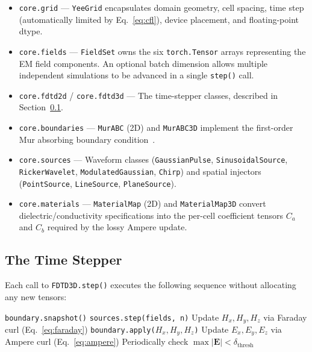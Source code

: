 \documentclass[10pt,twocolumn]{article}
\begin{document}
\begin{itemize}
  \item \texttt{core.grid} — \texttt{YeeGrid} encapsulates domain geometry,
        cell spacing, time step (automatically limited by Eq.~\ref{eq:cfl}),
        device placement, and floating-point dtype.
  \item \texttt{core.fields} — \texttt{FieldSet} owns the six
        \texttt{torch.Tensor} arrays representing the EM field components.
        An optional batch dimension allows multiple independent simulations
        to be advanced in a single \texttt{step()} call.
  \item \texttt{core.fdtd2d} / \texttt{core.fdtd3d} — The time-stepper
        classes, described in Section~\ref{sec:stepper}.
  \item \texttt{core.boundaries} — \texttt{MurABC} (2D) and
        \texttt{MurABC3D} implement the first-order Mur absorbing boundary
        condition~\cite{mur1981absorbing}.
  \item \texttt{core.sources} — Waveform classes (\texttt{GaussianPulse},
        \texttt{SinusoidalSource}, \texttt{RickerWavelet},
        \texttt{ModulatedGaussian}, \texttt{Chirp}) and spatial injectors
        (\texttt{PointSource}, \texttt{LineSource}, \texttt{PlaneSource}).
  \item \texttt{core.materials} — \texttt{MaterialMap} (2D) and
        \texttt{MaterialMap3D} convert dielectric/conductivity specifications
        into the per-cell coefficient tensors $C_a$ and $C_b$ required by
        the lossy Ampere update.
\end{itemize}

\subsection{The Time Stepper}
\label{sec:stepper}

Each call to \texttt{FDTD3D.step()} executes the following sequence without
allocating any new tensors:

\begin{algorithm}[h]
\caption{Single FDTD time step (3D)}
\label{alg:step}
\begin{algorithmic}[1]
\State \texttt{boundary.snapshot()} 
\State \texttt{sources.step(fields, n)} 
\State Update $H_x, H_y, H_z$ via Faraday curl (Eq.~\ref{eq:faraday})
\State \texttt{boundary.apply($H_x, H_y, H_z$)} 
\State Update $E_x, E_y, E_z$ via Ampere curl (Eq.~\ref{eq:ampere})
\State Periodically check $\max|\mathbf{E}| < \delta_\text{thresh}$
\end{algorithmic}
\end{algorithm}
\end{document}
